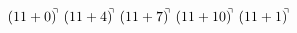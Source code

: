 \documentclass[preview]{standalone}
\begin{document}
\begin{align*}
(11+0)^{\hspace{-0.1cm}\urcorner} \ (11+4)^{\hspace{-0.1cm}\urcorner} \ (11+7)^{\hspace{-0.1cm}\urcorner} \ (11+10)^{\hspace{-0.1cm}\urcorner} \ (11+1)^{\hspace{-0.1cm}\urcorner}
\end{align*}
\end{document}
